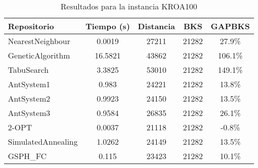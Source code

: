\begin{table}[H]
\centering
\caption{Resultados para la instancia KROA100}
\begin{tabular}{|l|c|c|c|c|}
\hline
\textbf{Repositorio} & \textbf{Tiempo (s)} & \textbf{Distancia} & \textbf{BKS} & \textbf{GAPBKS} \\ 
\hline
NearestNeighbour & 0.0019 & 27211 & 21282 & 27.9\% \\ 
GeneticAlgorithm & 16.5821 & 43862 & 21282 & 106.1\% \\ 
TabuSearch & 3.3825 & 53010 & 21282 & 149.1\% \\ 
AntSystem1 & 0.983 & 24221 & 21282 & 13.8\% \\ 
AntSystem2 & 0.9923 & 24150 & 21282 & 13.5\% \\ 
AntSystem3 & 0.9584 & 26835 & 21282 & 26.1\% \\ 
2-OPT & 0.0037 & 21118 & 21282 & -0.8\% \\ 
SimulatedAnnealing & 1.0262 & 24149 & 21282 & 13.5\% \\ 
GSPH_FC & 0.115 & 23423 & 21282 & 10.1\% \\ 
\hline
\end{tabular}
\end{table}
